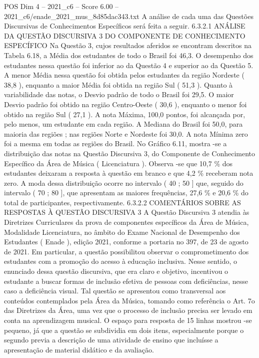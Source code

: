 \begin{textsample}{POS Dim 4 – 2021\_c6 – Score 6.00 – 2021\_c6/enade\_2021\_mus\_8d85dac343.txt}
A análise de cada uma das Questões Discursivas de Conhecimentos Específicos será feita a seguir. 6.3.2.1 ANÁLISE DA QUESTÃO DISCURSIVA 3 DO COMPONENTE DE CONHECIMENTO ESPECÍFICO Na Questão 3, cujos resultados aferidos se encontram descritos na Tabela 6.18, a Média dos estudantes de todo o Brasil foi 46,3.
O desempenho dos estudantes nessa questão foi inferior ao da Questão 4 e superior ao da Questão 5.
A menor Média nessa questão foi obtida pelos estudantes da região Nordeste ( 38,8 ), enquanto a maior Média foi obtida na região Sul ( 51,3 ).
Quanto à variabilidade das notas, o Desvio padrão de todo o Brasil foi 29,5.
O maior Desvio padrão foi obtido na região Centro-Oeste ( 30,6 ), enquanto o menor foi obtido na região Sul ( 27,1 ).
A nota Máxima, 100,0 pontos, foi alcançada por, pelo menos, um estudante em cada região.
A Mediana do Brasil foi 50,0, para maioria das regiões ; nas regiões Norte e Nordeste foi 30,0.
A nota Mínima zero foi a mesma em todas as regiões do Brasil.
No Gráfico 6.11, mostra -se a distribuição das notas na Questão Discursiva 3, do Componente de Conhecimento Específico da Área de Música ( Licenciatura ).
Observa -se que 10,7 \% dos estudantes deixaram a resposta à questão em branco e que 4,2 \% receberam nota zero.
A moda dessa distribuição ocorre no intervalo ( 40 ; 50 ] que, seguido do intervalo ( 70 ; 80 ], que apresentam as maiores frequências, 27,6 \% e 20,6 \% do total de participantes, respectivamente. 6.3.2.2 COMENTÁRIOS SOBRE AS RESPOSTAS À QUESTÃO DISCURSIVA 3 A Questão Discursiva 3 atendia às Diretrizes Curriculares da prova de componentes específicos da Área de Música, Modalidade Licenciatura, no âmbito do Exame Nacional de Desempenho dos Estudantes ( Enade ), edição 2021, conforme a portaria no 397, de 23 de agosto de 2021.
Em particular, a questão possibilitou observar o comprometimento dos estudantes com a promoção do acesso à educação inclusiva.
Nesse sentido, o enunciado dessa questão discursiva, que era claro e objetivo, incentivou o estudante a buscar formas de inclusão efetiva de pessoas com deficiências, nesse caso a deficiência visual.
Tal questão se apresentou como transversal aos conteúdos contemplados pela Área da Música, tomando como referência o Art. 7o das Diretrizes da Área, uma vez que o processo de inclusão precisa ser levado em conta na aprendizagem musical.
O espaço para resposta de 15 linhas mostrou -se pequeno, já que a questão se subdividia em dois itens, especialmente porque o segundo previa a descrição de uma atividade de ensino que incluísse a apresentação de material didático e da avaliação.

\end{textsample}
